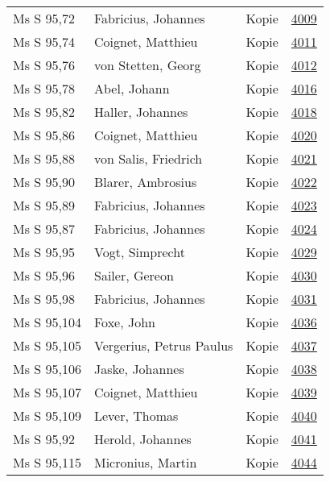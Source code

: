\documentclass[10pt,a4paper,landscape]{report}
\begin{document}
\begin{longtable}{p{16cm}p{4cm}lr}
Ms S 95,72	&	Fabricius, Johannes	&	Kopie	&	\href{http://130.60.24.72/assignment/4009}{4009}\\
Ms S 95,74	&	Coignet, Matthieu	&	Kopie	&	\href{http://130.60.24.72/assignment/4011}{4011}\\
Ms S 95,76	&	von Stetten, Georg	&	Kopie	&	\href{http://130.60.24.72/assignment/4012}{4012}\\
Ms S 95,78	&	Abel, Johann	&	Kopie	&	\href{http://130.60.24.72/assignment/4016}{4016}\\
Ms S 95,82	&	Haller, Johannes	&	Kopie	&	\href{http://130.60.24.72/assignment/4018}{4018}\\
Ms S 95,86	&	Coignet, Matthieu	&	Kopie	&	\href{http://130.60.24.72/assignment/4020}{4020}\\
Ms S 95,88	&	von Salis, Friedrich	&	Kopie	&	\href{http://130.60.24.72/assignment/4021}{4021}\\
Ms S 95,90	&	Blarer, Ambrosius	&	Kopie	&	\href{http://130.60.24.72/assignment/4022}{4022}\\
Ms S 95,89	&	Fabricius, Johannes	&	Kopie	&	\href{http://130.60.24.72/assignment/4023}{4023}\\
Ms S 95,87	&	Fabricius, Johannes	&	Kopie	&	\href{http://130.60.24.72/assignment/4024}{4024}\\
Ms S 95,95	&	Vogt, Simprecht	&	Kopie	&	\href{http://130.60.24.72/assignment/4029}{4029}\\
Ms S 95,96	&	Sailer, Gereon	&	Kopie	&	\href{http://130.60.24.72/assignment/4030}{4030}\\
Ms S 95,98	&	Fabricius, Johannes	&	Kopie	&	\href{http://130.60.24.72/assignment/4031}{4031}\\
Ms S 95,104	&	Foxe, John	&	Kopie	&	\href{http://130.60.24.72/assignment/4036}{4036}\\
Ms S 95,105	&	Vergerius, Petrus Paulus	&	Kopie	&	\href{http://130.60.24.72/assignment/4037}{4037}\\
Ms S 95,106	&	Jaske, Johannes	&	Kopie	&	\href{http://130.60.24.72/assignment/4038}{4038}\\
Ms S 95,107	&	Coignet, Matthieu	&	Kopie	&	\href{http://130.60.24.72/assignment/4039}{4039}\\
Ms S 95,109	&	Lever, Thomas	&	Kopie	&	\href{http://130.60.24.72/assignment/4040}{4040}\\
Ms S 95,92	&	Herold, Johannes	&	Kopie	&	\href{http://130.60.24.72/assignment/4041}{4041}\\
Ms S 95,115	&	Micronius, Martin	&	Kopie	&	\href{http://130.60.24.72/assignment/4044}{4044}\\

\end{longtable}
\end{document}
